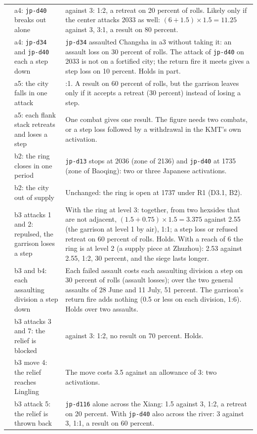\documentclass[11pt]{article}
\begin{document}
{\begin{longtable}{@{}>{\raggedright\arraybackslash}p{}>{\raggedright\arraybackslash}p{}>{\raggedright\arraybackslash}p{}@{}}
2 & a4: \texttt{jp-d40} breaks out alone & 1.5 against 3: 1:2, a retreat on 20 percent of rolls. Likely only if the center attacks 2033 as well: $(6+1.5)\times 1.5=11.25$ against 3, 3:1, a result on 80 percent. \\
2 & a4: \texttt{jp-d34} and \texttt{jp-d40} each a step down & \texttt{jp-d34} assaulted Changsha in a3 without taking it: an assault loss on 30 percent of rolls. The attack of \texttt{jp-d40} on 2033 is not on a fortified city; the return fire it meets gives a step loss on 10 percent. Holds in part. \\
2 & a5: the city falls in one attack & 1:1. A result on 60 percent of rolls, but the garrison leaves only if it accepts a retreat (30 percent) instead of losing a step. \\
2 & a5: each flank stack retreats and loses a step & One combat gives one result. The figure needs two combats, or a step loss followed by a withdrawal in the KMT's own activation. \\
3 & b2: the ring closes in one period & \texttt{jp-d13} stops at 2036 (zone of 2136) and \texttt{jp-d40} at 1735 (zone of Baoqing): two or three Japanese activations. \\
3 & b2: the city out of supply & Unchanged: the ring is open at 1737 under R1 (D3.1, B2). \\
3 & b3 attacks 1 and 2: repulsed, the garrison loses a step & With the ring at level 3: together, from two hexsides that are not adjacent, $(1.5+0.75)\times 1.5=3.375$ against 2.55 (the garrison at level 1 by air), 1:1; a step loss or refused retreat on 60 percent of rolls. Holds. With a reach of 6 the ring is at level 2 (a supply piece at Zhuzhou): 2.53 against 2.55, 1:2, 30 percent, and the siege lasts longer. \\
3 & b3 and b4: each assaulting division a step down & Each failed assault costs each assaulting division a step on 30 percent of rolls (assault losses); over the two general assaults of 28 June and 11 July, 51 percent. The garrison's return fire adds nothing (0.5 or less on each division, 1:6). Holds over two assaults. \\
3 & b3 attacks 3 and 7: the relief is blocked & 2 against 3: 1:2, no result on 70 percent. Holds. \\
3 & b3 move 4: the relief reaches Lingling & The move costs 3.5 against an allowance of 3: two activations. \\
3 & b3 attack 5: the relief is thrown back & \texttt{jp-d116} alone across the Xiang: 1.5 against 3, 1:2, a retreat on 20 percent. With \texttt{jp-d40} also across the river: 3 against 3, 1:1, a result on 60 percent. \\

\end{longtable}}
\end{document}
